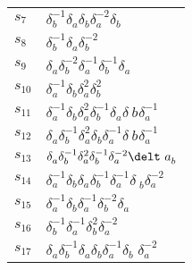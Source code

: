 \documentclass{article}
\begin{document}
\begin{center}
\begin{tabular}{ll}
$s_{7}$ & $\delta_b^{-1}\delta_a^{}\delta_b^{}\delta_a^{-2}\delta_b^{}$ \\
$s_{8}$ & $\delta_b^{-1}\delta_a^{}\delta_b^{-2}$ \\
$s_{9}$ & $\delta_a^{}\delta_b^{-2}\delta_a^{-1}\delta_b^{-1}\delta_a^{}$ \\
$s_{10}$ & $\delta_a^{-1}\delta_b^{}\delta_a^{2}\delta_b^{2}$ \\
$s_{11}$ & $\delta_a^{-1}\delta_b^{}\delta_a^{2}\delta_b^{-1}\delta_a^{}\delta_\
b^{}\delta_a^{-1}$ \\
$s_{12}$ & $\delta_a^{}\delta_b^{-1}\delta_a^{2}\delta_b^{}\delta_a^{-1}\delta_\
b^{}\delta_a^{-1}$ \\
$s_{13}$ & $\delta_a^{}\delta_b^{-1}\delta_a^{2}\delta_b^{-1}\delta_a^{-2}\delt\
a_b^{}$ \\
$s_{14}$ & $\delta_a^{-1}\delta_b^{}\delta_a^{}\delta_b^{-1}\delta_a^{-1}\delta\
_b^{}\delta_a^{-2}$ \\
$s_{15}$ & $\delta_a^{-1}\delta_b^{}\delta_a^{-1}\delta_b^{-2}\delta_a^{}$ \\
$s_{16}$ & $\delta_b^{-1}\delta_a^{-1}\delta_b^{2}\delta_a^{-2}$ \\
$s_{17}$ & $\delta_a^{}\delta_b^{-1}\delta_a^{}\delta_b^{}\delta_a^{-1}\delta_b\
^{}\delta_a^{-2}$ \\
\bottomrule
\end{tabular}
\end{center}

\thispagestyle{empty}
\end{document}
